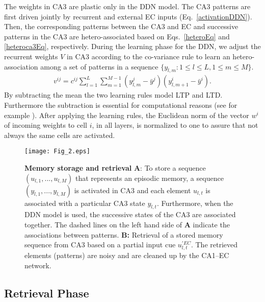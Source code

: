 \documentclass[utf8]{frontiersSCNS} %
\begin{document}
The weights in CA3 are plastic only in the DDN model. The CA3 patterns are first driven jointly by recurrent and external EC inputs (Eq.~\ref{activationDDN}). Then, the corresponding patterns between the CA3 and EC and successive patterns in the CA3 are hetero-associated based on  Eqs.~\ref{heteroEq} and \ref{heteroca3Eq}, respectively.
%
During the learning phase for the DDN, we adjust the recurrent weights $V$ in CA3 according to the co-variance rule \citep{sejnowski1977storing} to learn an hetero-association among a set of patterns in a sequence $\{ y_{l, m}: 1\le l \le L, 1\le m \le M\}$.
\begin{align}
	\label{heteroca3Eq}
	v^{ij} =  c^{ij}\sum_{l=1}^L{\sum_{m=1}^{M-1}(y^j_{l, m}  - \bar {y}^j)(y_{l, m+1}^i - \bar{y}^i)}.
\end{align}
By subtracting the mean the two learning rules model LTP and LTD. Furthermore the subtraction is essential for computational reasons (see for example \citep[chapter 8.2]{amit1992modeling}).
%
After applying the learning rules, the Euclidean norm of the vector $w^i$ of incoming weights to cell $i$, in all layers, is normalized to one to assure that not always the same cells are activated. 
%
\begin{figure}[!htb]
\centering\texttt{[image: Fig\_2.eps]}
\caption{\textbf{Memory storage and retrieval} \textbf A: To store a sequence $(u_{l,1} , . . . ,u_{l,M})$ that represents an episodic memory, a sequence $(y_{l,1} , . . . ,y_{l,M})$ is activated in CA3 and each element $u_{l,t}$ is associated with a particular CA3 state $y_{l,t}$. Furthermore, when the DDN model is used, the successive states of the CA3 are associated together. The dashed lines on the left hand side of \textbf{A} indicate the associations between patterns.  
\textbf{B:} Retrieval of a stored memory sequence from CA3 based on a partial input cue $u^{'EC}_{l,t}$. The retrieved elements (patterns) are noisy and are cleaned up by the CA1–EC network.}
\label{Fig_2}
\end{figure}

\subsection{Retrieval Phase}
\label{S:4}
\end{document}
